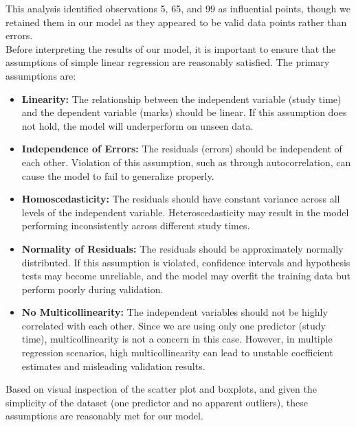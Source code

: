 \documentclass{article}
\begin{document}
\noindent This analysis identified observations 5, 65, and 99 as influential points, though we retained them in our model as they appeared to be valid data points rather than errors.\\

\noindent Before interpreting the results of our model, it is important to ensure that the assumptions of simple linear regression are reasonably satisfied. The primary assumptions are:

\begin{itemize}
    \item \textbf{Linearity:} The relationship between the independent variable (study time) and the dependent variable (marks) should be linear. If this assumption does not hold, the model will underperform on unseen data.
    
    \item \textbf{Independence of Errors:} The residuals (errors) should be independent of each other. Violation of this assumption, such as through autocorrelation, can cause the model to fail to generalize properly.
    
    \item \textbf{Homoscedasticity:} The residuals should have constant variance across all levels of the independent variable. Heteroscedasticity may result in the model performing inconsistently across different study times.
    
    \item \textbf{Normality of Residuals:} The residuals should be approximately normally distributed. If this assumption is violated, confidence intervals and hypothesis tests may become unreliable, and the model may overfit the training data but perform poorly during validation.
    
    \item \textbf{No Multicollinearity:} The independent variables should not be highly correlated with each other. Since we are using only one predictor (study time), multicollinearity is not a concern in this case. However, in multiple regression scenarios, high multicollinearity can lead to unstable coefficient estimates and misleading validation results.
\end{itemize}

\noindent Based on visual inspection of the scatter plot and boxplots, and given the simplicity of the dataset (one predictor and no apparent outliers), these assumptions are reasonably met for our model.

\end{document}
